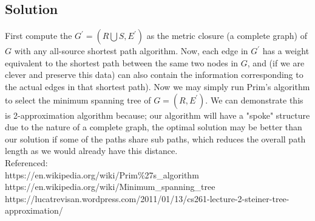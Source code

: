 \documentclass[]{article}
\begin{document}
\subsection*{Solution}
First compute the $G^{'} = (R \bigcup S, E^{'})$ as the metric closure (a complete graph) of $G$ with any all-source shortest path algorithm. Now, each edge in $G^{'}$ has a weight equivalent to the shortest path between the same two nodes in $G$, and (if we are clever and preserve this data) can also contain the information corresponding to the actual edges in that shortest path). Now we may simply run Prim's algorithm to select the minimum spanning tree of $G = (R, E^{'})$. We can demonstrate this is 2-approximation algorithm because; our algorithm will have a "spoke" structure due to the nature of a complete graph, the optimal solution may be better than our solution if some of the paths share sub paths, which reduces the overall path length as we would already have this distance. \\


Referenced:\\
https://en.wikipedia.org/wiki/Prim\%27s\_algorithm\\
https://en.wikipedia.org/wiki/Minimum\_spanning\_tree\\
https://lucatrevisan.wordpress.com/2011/01/13/cs261-lecture-2-steiner-tree-approximation/
\end{document}
